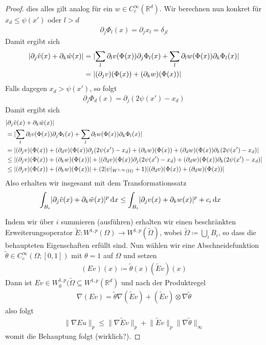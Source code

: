 \documentclass{scrartcl}
\def\R{\mathbb{R}}
\newcommand{\dif}[1]{\,\mathrm{d} #1}
\newcommand{\norm}[1]{\lVert #1 \rVert}
\DeclarePairedDelimiter{\abs}{|}{|}
\begin{document}
\begin{proof}
	dies alles gilt analog für ein $w\in C_c^\infty(\R^d)$.
	Wir berechnen nun konkret für $x_d\leq\psi(x')$ oder $l>d$
	\begin{align*}
		\partial_j \Phi_l(x)
		= \partial_jx_l = \delta_{jl}
	\end{align*}
	Damit ergibt sich
	\begin{align*}
		\abs{\partial_j\tilde{v}(x)+\partial_k\tilde{w}(x)}
		&= \abs{\sum_{l}\partial_lv(\Phi(x))\partial_j\Phi_l(x)+\sum_l\partial_lw(\Phi(x))\partial_k\Phi_l(x)} \\
		&= \abs{(\partial_jv)(\Phi(x))+(\partial_kw)(\Phi(x))}
	\end{align*}
	Falls dagegen $x_d>\psi(x')$, so folgt
	\begin{align*}
		\partial_j\Phi_d(x)
		= \partial_j(2\psi(x')-x_d)
	\end{align*}
	Damit ergibt sich
	\begin{align*}
		&\abs{\partial_j\tilde{v}(x)+\partial_k\tilde{w}(x)} \\
		&= \abs{\sum_{l}\partial_lv(\Phi(x))\partial_j\Phi_l(x)+\sum_l\partial_lw(\Phi(x))\partial_k\Phi_l(x)} \\
		&= \abs{(\partial_jv)(\Phi(x))+(\partial_dv)(\Phi(x))\partial_j(2\psi(x')-x_d)+(\partial_kw)(\Phi(x))+(\partial_dw)(\Phi(x))\partial_k(2\psi(x')-x_d)} \\
		&\leq \abs{(\partial_jv)(\Phi(x))+(\partial_kw)(\Phi(x))}+\abs{(\partial_dv)(\Phi(x))\partial_j(2\psi(x')-x_d)+(\partial_dw)(\Phi(x))\partial_k(2\psi(x')-x_d)} \\
		&\leq \abs{(\partial_jv)(\Phi(x))+(\partial_kw)(\Phi(x))}+(2\abs{\psi}_{W^{1,\infty}(\Omega)}+1)\abs{(\partial_dv)(\Phi(x))+(\partial_dw)(\Phi(x))}
	\end{align*}
	Also erhalten wir insgesamt mit dem Transformationssatz
	\begin{align*}
		\int_{B_i}\abs{\partial_j\tilde{v}(x)+\partial_k\tilde{w}(x)}^p\dif x 
		&\leq \int_{B_i}\abs{\partial_jv(x)+\partial_kw(x)}^p+c_i\dif x 
	\end{align*}
	
	Indem wir über $i$ summieren (ausführen) erhalten wir einen beschränkten Erweiterungsoperator $\tilde{E}\colon W^{1,p}(\Omega)\to W^{1,p}(\tilde{\Omega})$, wobei $\tilde{\Omega}\coloneqq\bigcup_iB_i$, so dass die behaupteten Eigenschaften erfüllt sind. Nun wählen wir eine Abschneidefunktion $\tilde{\theta}\in C_c^\infty(\Omega;[0,1])$ mit $\theta=1$ auf $\Omega$ und setzen
	\begin{align*}
		(Ev)(x)\coloneqq\tilde{\theta}(x)(\tilde{E}v)(x)
	\end{align*}
	Dann ist $Ev\in W_0^{1,p}(\tilde{\Omega}\subseteq W^{1,p}(\R^d)$ und nach der Produktregel
	\begin{align*}
		\nabla(Ev)=\tilde{\theta}\nabla(\tilde{E}v)+(\tilde{E}v)\otimes \nabla \tilde{\theta}
	\end{align*}
	also folgt
	\begin{align*}
		\norm{\nabla E u}_{p}\leq \norm{\nabla \tilde{E}v}_{p}+\norm{\tilde{E}v}_p\norm{\nabla\tilde{\theta}}_{\infty}
	\end{align*}
	womit die Behauptung folgt (wirklich?).
\end{proof}
\end{document}
